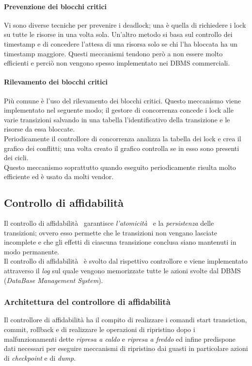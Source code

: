 \paragraph{Prevenzione dei blocchi critici} Vi sono diverse tecniche per prevenire i deadlock; una è quella di richiedere i lock su tutte le risorse in una volta sola. Un'altro metodo si basa sul controllo dei timestamp e di concedere l'attesa di una risorsa solo se chi l'ha bloccata ha un timestamp maggiore.
Questi meccanismi tendono però a non essere molto efficienti e perciò non vengono spesso implementato nei DBMS commerciali.
\paragraph{Rilevamento dei blocchi critici} Più comune è l'uso del rilevamento dei blocchi critici. Questo meccanismo viene implementato nel seguente modo; il gestore di concorrenza concede i lock alle varie transizioni salvando in una tabella l'identificativo della transizione e le risorse da essa bloccate.\\
Periodicamente il controllore di concorrenza analizza la tabella dei lock e crea il grafico dei conflitti; una volta creato il grafico controlla se in esso sono presenti dei cicli.\\
Questo meccanismo soprattutto quando eseguito periodicamente risulta molto efficiente ed è  usato da molti vendor.

\subsection{Controllo di affidabilità }
Il controllo di affidabilità  garantisce \emph{l'atomicità } e la \emph{persistenza} delle transizioni; ovvero esso permette che le transizioni non vengano lasciate incomplete e che gli effetti di ciascuna transizione conclusa siano mantenuti in modo permanente.\\
Il controllo di affidabilità  è svolto dal rispettivo controllore e viene implementato attraverso il \emph{log} sul quale vengono memorizzate tutte le azioni svolte dal DBMS (\emph{DataBase Management System}).
\subsubsection{Architettura del controllore di affidabilità }
Il controllore di affidabilità ha il compito di realizzare i comandi \textsf{start transiction, commit, rollback} e di realizzare le operazioni di ripristino dopo i malfunzionamenti dette \emph{ripresa a caldo} e \emph{ripresa a freddo} ed infine predispone dati necessari per eseguire meccanismi di ripristino dai guasti in particolare azioni di \emph{checkpoint} e di \emph{dump}.
